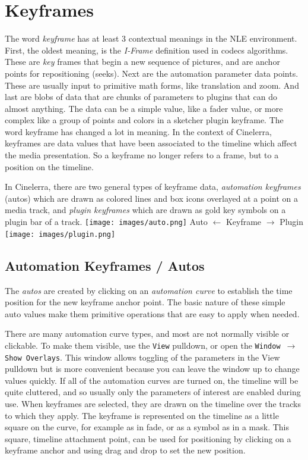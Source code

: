 \chapter{Keyframes}%
\label{cha:keyframes}

The word \textit{keyframe} has at least 3 contextual meanings in the NLE environment.  First, the oldest meaning, is the \textit{I-Frame} definition used in codecs algorithms.  These are \textit{key} frames that begin a new sequence of pictures, and are anchor points for repositioning (seeks).  Next are the automation parameter data points.  These are usually input to primitive math forms, like translation and zoom.  And last are blobs of data that are chunks of parameters to plugins that can do almost anything.  The data can be a simple value, like a fader value, or more complex like a group of points and colors in a sketcher plugin keyframe.  The word keyframe has changed a lot in meaning.  In the context of Cinelerra, keyframes are data values that have been associated to the timeline which affect the media presentation.  So a keyframe no longer refers to a frame, but to a position on the timeline.

In Cinelerra, there are two general types of keyframe data, \textit{automation keyfra\-mes} (autos) which are drawn as colored lines and box icons overlayed at a point on a media track, and \textit{plugin keyframes} which are drawn as gold key symbols on a plugin bar of a track.  \quad
\texttt{[image: images/auto.png]}	         
Auto $\leftarrow$ Keyframe $\rightarrow$ 
Plugin \texttt{[image: images/plugin.png]}

\section{Automation Keyframes / Autos}%
\label{sec:automation_keyframes_autos}

The \textit{autos} are created by clicking on an \textit{automation curve} to establish the time position for the new keyframe anchor point.  The basic nature of these simple auto values make them primitive operations that are easy to apply when needed.  

There are many automation curve types, and most are not normally visible or clickable.  To make them visible, use the \texttt{View} pulldown, or open the \texttt{Window $\rightarrow$ Show Overlays}. This window allows toggling of the parameters in the View pulldown but is more convenient because you can leave the window up to change values quickly.  If all of the automation curves are turned on, the timeline will be quite cluttered, and so usually only the parameters of interest are enabled during use.  When keyframes are selected, they are drawn on the timeline over the tracks to which they apply.  The keyframe is represented on the timeline as a little square on the curve, for example as in fade, or as a symbol as in a mask.  This square, timeline attachment point, can be used for positioning by clicking on a keyframe anchor and using drag and drop to set the new position.

